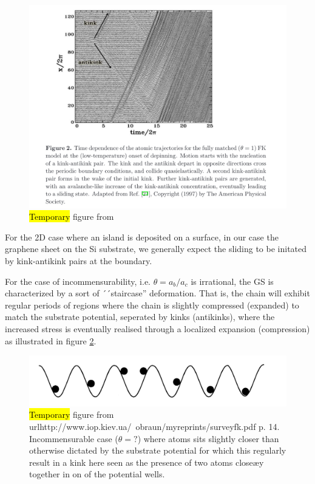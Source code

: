 \begin{figure}[H]
  \centering
  \includegraphics[width=0.8\linewidth]{figures/theory/kink_antikink.png}
  \caption{\hl{Temporary} figure from \cite{Manini_2016}}
  \label{fig:kink_antikink}
\end{figure}

For the 2D case where an island is deposited on a surface, in our case the graphene sheet on the Si substrate, we generally expect the sliding to be initated by kink-antikink pairs at the boundary. 

For the case of incommensurability, i.e. $\theta = a_b/a_c$ is irrational, the GS is characterized by a sort of ´´staircase'' deformation. That is, the chain will exhibit regular periods of regions where the chain is slightly compressed (expanded) to match the substrate potential, seperated by kinks (antikinks), where the increased stress is eventually realised through a localized expansion (compression) as illustrated in figure \ref{fig:incommensurable_example}.


\begin{figure}[H]
  \centering
  \includegraphics[width=0.5\linewidth]{figures/theory/incommensurable_example.png}
  \caption{\hl{Temporary} figure from url{http://www.iop.kiev.ua/~obraun/myreprints/surveyfk.pdf} p. 14. Incommensurable case ($\theta = ?$) where atoms sits slightly closer than otherwise dictated by the substrate potential for which this regularly result in a kink here seen as the presence of two atoms closeæy together in on of the potential wells.}
  \label{fig:incommensurable_example}
\end{figure}

